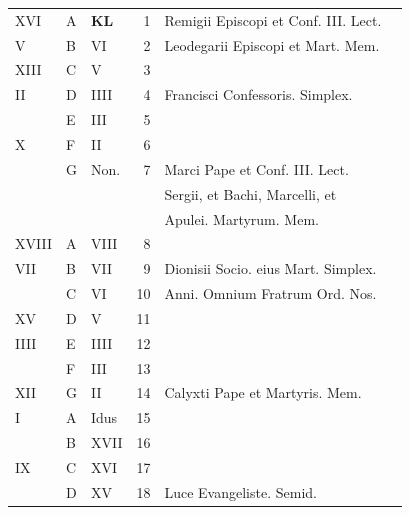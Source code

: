 \begin{center}
\begin{tabular}{l | l | l | r | l l}
\color{Red} XVI & \color{Red} A & \textbf{\color{Red} K\color{Blue}L} & 1 & \color{Red} Remigii Episcopi et Conf. III. Lect. \\
\color{Red} V & B & \color{Red} VI & 2 & \color{Red} Leodegarii Episcopi et Mart. Mem. \\
\color{Red} XIII & C & \color{Red} V & 3 & & \color{Red} \\
\color{Red} II & D & \color{Red} IIII & 4 & Francisci Confessoris. Simplex. & \color{Red} \\
\color{Red}  & E & \color{Red} III & 5 & & \color{Red} \\
\color{Red} X & F & \color{Red} II & 6 & & \color{Red} \\
\color{Red}  & G & \color{Red} Non. & 7 & Marci Pape et Conf. III. Lect. \\
 &  & & & \multicolumn{2}{l}{\quad Sergii, et Bachi, Marcelli, et} \\
 &  & & & \multicolumn{2}{l}{\quad Apulei. Martyrum. Mem.} \\
\color{Red} XVIII & \color{Red} A & \color{Red} VIII & 8 & & \color{Red} \\
\color{Red} VII & B & \color{Red} VII & 9 & \multicolumn{2}{l}{\color{Red} Dionisii Socio. eius Mart. Simplex.} \\
\color{Red}  & C & \color{Red} VI & 10 & \multicolumn{2}{l}{\color{Red} Anni. Omnium Fratrum Ord. Nos.} \\
\color{Red} XV & D & \color{Red} V & 11 & & \color{Red} \\
\color{Red} IIII & E & \color{Red} IIII & 12 & & \color{Red} \\
\color{Red}  & F & \color{Red} III & 13 &  & \color{Red} \\
\color{Red} XII & G & \color{Red} II & 14 & Calyxti Pape et Martyris. Mem. & \color{Red} \\
\color{Red} I & \color{Red} A & \color{Red} Idus & 15 & & \color{Red} \\
\color{Red}  & B & \color{Red} XVII & 16 &  & \color{Red} \\
\color{Red} IX & C & \color{Red} XVI & 17 &  & \color{Red} \\
\color{Red}  & D & \color{Red} XV & 18 & Luce Evangeliste. Semid. & \\


\end{tabular}
\end{center}
